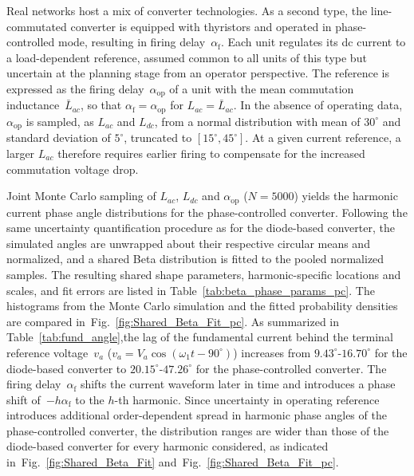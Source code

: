 Real networks host a mix of converter technologies. As a second type, the line-commutated converter is equipped with thyristors and operated in phase-controlled mode, resulting in firing delay~$\alpha_{\text{f}}$. Each unit regulates its dc current to a load-dependent reference, assumed common to all units of this type but uncertain at the planning stage from an operator perspective. The reference is expressed as the firing delay~$\alpha_{\text{op}}$ of a unit with the mean commutation inductance~$\bar{L}_{ac}$, so that $\alpha_{\text{f}} = \alpha_{\text{op}}$ for $L_{ac} = \bar{L}_{ac}$. In the absence of operating data, $\alpha_{\text{op}}$ is sampled, as $L_{ac}$ and $L_{dc}$, from a normal distribution with mean of $30^{\circ}$ and standard deviation of $5^{\circ}$, truncated to $[15^{\circ}, 45^{\circ}]$.
At a given current reference, a larger $L_{ac}$ therefore requires earlier firing to compensate for the increased commutation voltage drop.

Joint Monte Carlo sampling of $L_{ac}$, $L_{dc}$ and $\alpha_{\text{op}}$ ($N = 5000$) yields the harmonic current phase angle distributions for the phase-controlled converter. Following the same uncertainty quantification procedure as for the diode-based converter, the simulated angles are unwrapped about their respective circular means and normalized, and a shared Beta distribution is fitted to the pooled normalized samples. The resulting shared shape parameters, harmonic-specific locations and scales, and fit errors are listed in Table~\ref{tab:beta_phase_params_pc}. The histograms from the Monte Carlo simulation and the fitted probability densities are compared in~Fig.~\ref{fig:Shared_Beta_Fit_pc}. As summarized in Table~\ref{tab:fund_angle},the lag of the fundamental current behind the terminal reference voltage~$v_a$ ($v_a = V_a\cos(\omega_1 t - 90^{\circ})$) increases from $9.43^{\circ}$-$16.70^{\circ}$ for the diode-based converter to $20.15^{\circ}$-$47.26^{\circ}$ for the phase-controlled converter. The firing delay~$\alpha_{\text{f}}$ shifts the current waveform later in time and introduces a phase shift of~$-h\alpha_{\text{f}}$ to the $h$-th harmonic. Since uncertainty in operating reference introduces additional order-dependent spread in harmonic phase angles of the phase-controlled converter, the distribution ranges are wider than those of the diode-based converter for every harmonic considered, as indicated in~Fig.~\ref{fig:Shared_Beta_Fit} and~Fig.~\ref{fig:Shared_Beta_Fit_pc}.

